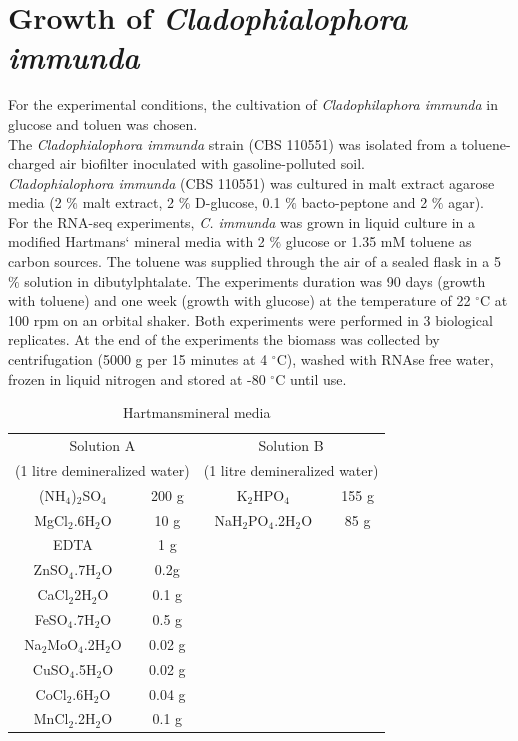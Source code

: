 \documentclass[12pt, a4paper]{report}
\begin{document}
\section{Growth of \textit{Cladophialophora immunda}}
For the experimental conditions, the cultivation of \textit{Cladophilaphora immunda} in glucose and toluen was chosen. \\
The \textit{Cladophialophora immunda} strain (CBS 110551) was isolated from a toluene-charged air biofilter inoculated with gasoline-polluted soil. \cite{Prenafeta-Boldu2001} \\
\textit{Cladophialophora immunda} (CBS 110551) was cultured in malt extract agarose media (2 $\%$ malt extract, 2 $\%$ D-glucose, 0.1 $\%$ bacto-peptone and 2 $\%$ agar). \\
For the RNA-seq experiments, \textit{C. immunda} was grown in liquid culture in a modified Hartmans` mineral media with 2 $\%$ glucose or 1.35 mM toluene as carbon sources. \cite{Hartmans1991} The toluene was supplied through the air of a sealed flask in a 5 $\%$ solution in dibutylphtalate. The experiments duration was 90 days (growth with toluene) and one week (growth with glucose) at the temperature of 22 $^\circ$C at 100 rpm on an orbital shaker. Both experiments were performed in 3 biological replicates. At the end of the experiments the biomass was collected by centrifugation (5000 g per 15 minutes at 4 $^\circ$C), washed with RNAse free water, frozen in liquid nitrogen and stored at -80 $^\circ$C until use. \\

\begin{table}[h]
	\centering
	\begin{tabular}{c c | c c}
		\multicolumn{2}{c|}{Solution A} & \multicolumn{2}{c}{Solution B}  \\
		\multicolumn{2}{c|}{(1 litre demineralized water)}  & \multicolumn{2}{c}{(1 litre demineralized water)} \\
		\hline
		(NH$_4$)$_2$SO$_4$ & 200 g & K$_2$HPO$_4$ & 155 g\\
		MgCl$_2$.6H$_2$O & 10 g & NaH$_2$PO$_4$.2H$_2$O & 85 g \\
		EDTA & 1 g & &  \\
		ZnSO$_4$.7H$_2$O & 0.2g & & \\
		CaCl$_2$2H$_2$O & 0.1 g & & \\
		FeSO$_4$.7H$_2$O & 0.5 g & & \\
		Na$_2$MoO$_4$.2H$_2$O & 0.02 g & &\\                                
		CuSO$_4$.5H$_2$O & 0.02 g & & \\
		CoCl$_2$.6H$_2$O & 0.04 g & & \\
		MnCl$_2$.2H$_2$O & 0.1 g & & \\                          
	\end{tabular}
	\caption{Hartmans\textquotesingle mineral media}
\end{table}
\end{document}
